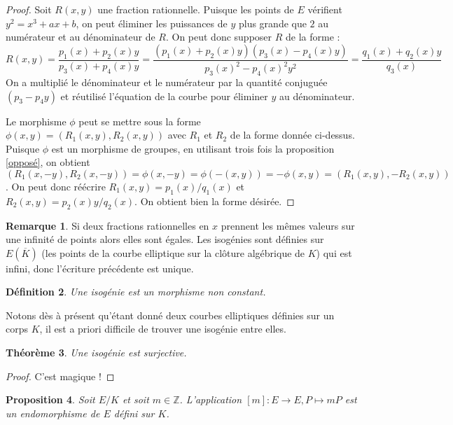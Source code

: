 \documentclass{article}
\theoremstyle{plain}%
\newtheorem{thm}{Théorème}[section]
\newtheorem{prop}[thm]{Proposition}
\newtheorem{deff}[thm]{Définition}
\theoremstyle{definition}%
\newtheorem{rem}[thm]{Remarque}
\newcommand{\Z}{\mathbb{Z}}
\begin{document}
\begin{proof}
  Soit $R(x, y)$ une fraction rationnelle. Puisque les points de $E$ vérifient $y^2 = x^3 + ax + b$, on peut éliminer les puissances de $y$ plus grande que $2$ au numérateur et au dénominateur de $R$. On peut donc supposer $R$ de la forme : $$R(x, y) = \frac{p_1(x) + p_2(x)y}{p_3(x)+p_4(x)y} = \frac{(p_1(x) + p_2(x)y)(p_3(x)-p_4(x)y)}{p_3(x)^2 - p_4(x)^2y^2} = \frac{q_1(x) +q_2(x)y}{q_3(x)} $$
 On a multiplié le dénominateur et le numérateur par la quantité conjuguée $(p_3-p_4y)$ et réutilisé l'équation de la courbe pour éliminer $y$ au dénominateur.

 Le morphisme $\phi$ peut se mettre sous la forme $\phi(x, y) = (R_1(x, y), R_2(x, y))$ avec $R_1$ et $R_2$ de la forme donnée ci-dessus. Puisque $\phi$ est un morphisme de groupes, en utilisant trois fois la proposition \ref{opposé}, on obtient
 $(R_1(x, -y), R_2(x, -y)) = \phi(x, -y) = \phi(-(x, y)) = -\phi(x, y) = (R_1(x, y), -R_2(x, y))$. On peut donc réécrire $R_1(x, y) = p_1(x) / q_1(x)$ et $R_2(x, y) = p_2(x)y/q_2(x)$. On obtient bien la forme désirée.
\end{proof}

\begin{rem}
  Si deux fractions rationnelles en $x$ prennent les mêmes valeurs sur une infinité de points alors elles sont égales. Les isogénies sont définies sur $E(\overline{K})$ (les points de la courbe elliptique sur la clôture algébrique de $K$) qui est infini, donc l'écriture précédente est unique.
\end{rem}


\begin{deff}
  Une isogénie est un morphisme non constant.
\end{deff}

Notons dès à présent qu'étant donné deux courbes elliptiques définies sur un corps $K$, il est a priori difficile de trouver une isogénie entre elles.

\begin{thm}
  Une isogénie est surjective.  
\end{thm}

\begin{proof}
  C'est magique !
\end{proof}

\begin{prop}
  Soit $E/K$ et soit $m\in\Z$. L'application $[m] : E \to E, P \mapsto mP$ est un endomorphisme de $E$ défini sur $K$. 
\end{prop}
\end{document}
